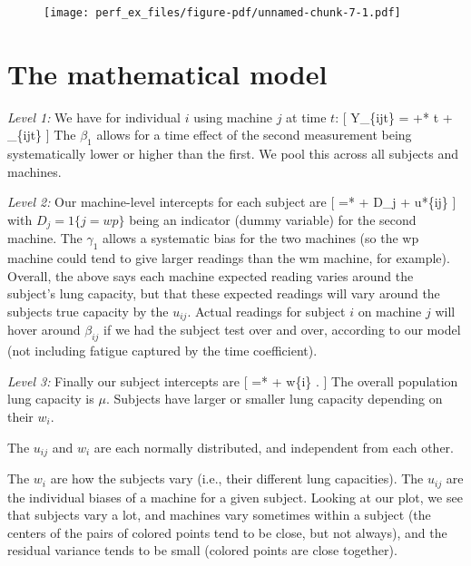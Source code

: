\documentclass[
  letterpaper,
  DIV=11,
  numbers=noendperiod]{scrreprt}
\begin{document}
\begin{figure}[H]

{\centering \texttt{[image: perf\_ex\_files/figure-pdf/unnamed-chunk-7-1.pdf]}

}

\end{figure}

\hypertarget{the-mathematical-model-1}{%
\section{The mathematical model}\label{the-mathematical-model-1}}

\emph{Level 1:} We have for individual \(i\) using machine \(j\) at time
\(t\): {[} Y\_\{ijt\} =  +*  t + \epsilon\_\{ijt\}
{]} The \(\beta_{1}\) allows for a time effect of the second measurement
being systematically lower or higher than the first. We pool this across
all subjects and machines.

\emph{Level 2:} Our machine-level intercepts for each subject are {[}
 =*  +  D\_j + u*\{ij\} {]} with
\(D_j = 1\{ j = wp \}\) being an indicator (dummy variable) for the
second machine. The \(\gamma_1\) allows a systematic bias for the two
machines (so the wp machine could tend to give larger readings than the
wm machine, for example). Overall, the above says each machine expected
reading varies around the subject's lung capacity, but that these
expected readings will vary around the subjects true capacity by the
\(u_{ij}\). Actual readings for subject \(i\) on machine \(j\) will
hover around \(\beta_{ij}\) if we had the subject test over and over,
according to our model (not including fatigue captured by the time
coefficient).

\emph{Level 3:} Finally our subject intercepts are {[}  =*
\mu + w\{i\} . {]} The overall population lung capacity is \(\mu\).
Subjects have larger or smaller lung capacity depending on their
\(w_{i}\).

The \(u_{ij}\) and \(w_i\) are each normally distributed, and
independent from each other.

The \(w_i\) are how the subjects vary (i.e., their different lung
capacities). The \(u_{ij}\) are the individual biases of a machine for a
given subject. Looking at our plot, we see that subjects vary a lot, and
machines vary sometimes within a subject (the centers of the pairs of
colored points tend to be close, but not always), and the residual
variance tends to be small (colored points are close together).
\end{document}
